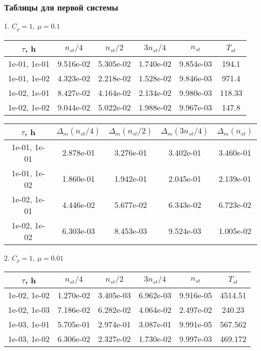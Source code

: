 \subsubsection{Таблицы для первой системы}
1. $C_{\rho} = 1, \ \mu = 0.1$
\begin{center}
	\begin{tabular}{ |c|c|c|c|c|c| } 
		\hline
		$\tau$, h & $n_{st}/ 4$ & $n_{st}/ 2$ & $3n_{st}/ 4$ & $n_{st}$ & $T_{st}$ \\ 
		\hline
		1e-01, 1e-01 & 9.516e-02 & 5.305e-02 & 1.740e-02 & 9.854e-03 & 194.1\\ 
		\hline
		1e-01, 1e-02 & 4.323e-02 & 2.218e-02 & 1.528e-02 & 9.846e-03 & 971.4\\ 
		\hline
		1e-02, 1e-01 & 8.427e-02 & 4.164e-02 & 2.134e-02 & 9.980e-03 & 118.33\\ 
		\hline
		1e-02, 1e-02 & 9.044e-02 & 5.022e-02 & 1.988e-02 & 9.967e-03 & 147.8\\ 
		\hline
	\end{tabular}
\end{center}

\begin{center}
	\begin{tabular}{ |c|c|c|c|c| } 
		\hline
		$\tau$, h & $\Delta_m (n_{st}/ 4)$ & $\Delta_m (n_{st}/ 2)$ & $\Delta_m (3n_{st}/ 4)$ & $\Delta_m (n_{st})$ \\ 
		\hline
		1e-01, 1e-01 & 2.878e-01 & 3.276e-01 & 3.402e-01 & 3.460e-01 \\ 
		\hline
		1e-01, 1e-02 & 1.860e-01 & 1.942e-01 & 2.045e-01 & 2.139e-01 \\ 
		\hline
		1e-02, 1e-01 & 4.446e-02 & 5.677e-02 & 6.343e-02 & 6.723e-02 \\ 
		\hline
		1e-02, 1e-02 & 6.303e-03 & 8.453e-03 & 9.524e-03 & 1.005e-02 \\ 
		\hline
	\end{tabular}
\end{center}

2. $C_{\rho} = 1, \ \mu = 0.01$
\begin{center}
	\begin{tabular}{ |c|c|c|c|c|c| } 
		\hline
		$\tau$, h & $n_{st}/ 4$ & $n_{st}/ 2$ & $3n_{st}/ 4$ & $n_{st}$ & $T_{st}$ \\ 
		\hline
		1e-02, 1e-02 & 1.270e-02 & 3.405e-03 & 6.962e-03 & 9.916e-05 & 4514.51\\ 
		\hline
		1e-02, 1e-03 & 7.186e-02 & 6.282e-02 & 4.064e-02 & 2.497e-02 & 240.23\\ 
		\hline
		1e-03, 1e-01 & 5.705e-01 & 2.974e-01 & 3.087e-01 & 9.991e-05 & 567.562\\ 
		\hline
		1e-03, 1e-02 & 6.306e-02 & 2.327e-02 & 1.730e-02 & 9.997e-03 & 469.172\\ 
		\hline
	\end{tabular}
\end{center}

